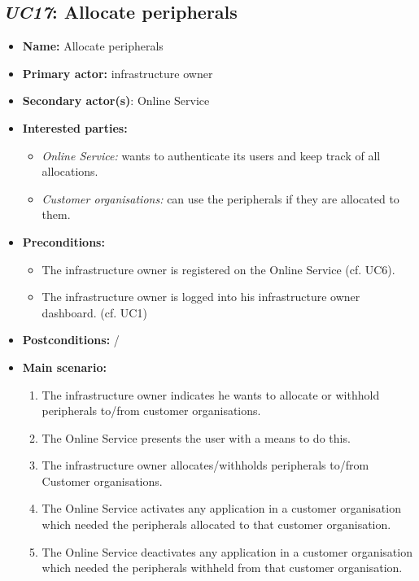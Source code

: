 \documentclass[english]{sareport}
\begin{document}
\subsection{\emph{UC17}: Allocate peripherals}
\begin{itemize}
    \item \textbf{Name:} Allocate peripherals
    \item \textbf{Primary actor:} infrastructure owner
    \item \textbf{Secondary actor(s)}: Online Service
    \item \textbf{Interested parties:} 
        \begin{itemize}
             \item \textit{Online Service:}  wants to authenticate its users and keep track of all allocations.
             \item \textit{Customer organisations: } can use the peripherals if they are allocated to them.
        \end{itemize}

    \item \textbf{Preconditions:}
        \begin{itemize}
            \item The infrastructure owner is registered on the Online Service (cf. UC6).
            \item The infrastructure owner is logged into his infrastructure owner dashboard. (cf. UC1)
        \end{itemize}

    \item \textbf{Postconditions:}
    /

        
    \item \textbf{Main scenario:} 
    \begin{enumerate}
       \item The infrastructure owner indicates he wants to allocate or withhold peripherals to/from customer organisations.
       \item The Online Service presents the user with a means to do this.
       \item The infrastructure owner allocates/withholds peripherals to/from Customer organisations.
       \item The Online Service activates any application in a customer organisation which needed the peripherals allocated to that customer organisation.
       \item The Online Service deactivates any application in a customer organisation which needed the peripherals withheld from that customer organisation.
    \end{enumerate}
\end{itemize}
\end{document}
